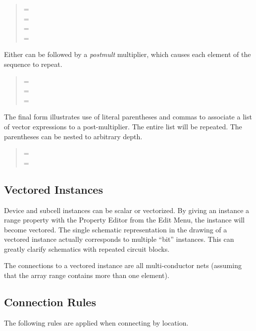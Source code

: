 \begin{quote}
{\vt [3:0]} = {\vt [3,2,1,0]}\\
{\vt [3:0:2]} = {\vt [3,1]}\\
{\vt [1:4]} = {\vt [1,2,3,4]}\\
{\vt [1:4:4]} = {\vt [1]}
\end{quote}

Either can be followed by a {\it postmult} multiplier, which causes
each element of the sequence to repeat.
\begin{quote}
{\vt [0*2]} = {\vt [0,0]}\\
{\vt [3:0*2]} = {\vt [3,3,2,2,1,1,0,0]}\\
{\vt [1:4:4*2]} = {\vt [1,1]}
\end{quote}

The final form illustrates use of literal parentheses and commas to
associate a list of vector expressions to a post-multiplier.  The
entire list will be repeated.  The parentheses can be nested to
arbitrary depth.

\begin{quote}
{\vt [(1,3:5)*3]} = {\vt [1,3,4,5,1,3,4,5,1,3,4,5]}\\
{\vt [(1,(2,3*2)*2,4:6)*2]} = {\vt [1,2,3,3,2,3,3,4,5,6,1,2,3,3,2,3,3,4,5,6]}
\end{quote}

\subsection{Vectored Instances}
\label{vecinst}

Device and subcell instances can be scalar or vectorized.  By giving
an instance a {\et range} property with the {\cb Property Editor} from
the {\cb Edit Menu}, the instance will become vectored.  The single
schematic representation in the drawing of a vectored instance
actually corresponds to multiple ``bit'' instances.  This can greatly
clarify schematics with repeated circuit blocks.

The connections to a vectored instance are all multi-conductor nets
(assuming that the array range contains more than one element).

\subsection{Connection Rules}

The following rules are applied when connecting by location.

